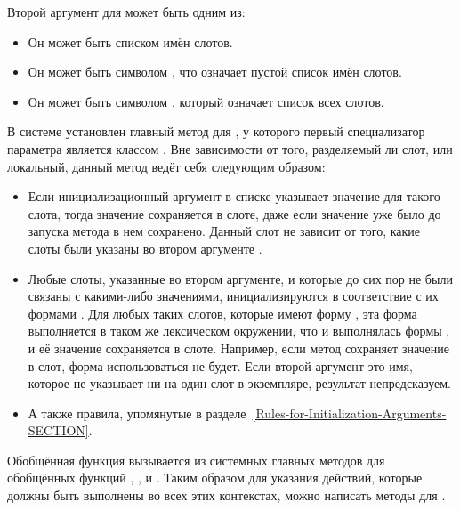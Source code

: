 Второй аргумент для  может быть одним из:

\begin{itemize}
\item Он может быть списком имён слотов.

\item Он может быть символом , что означает пустой список имён слотов.

\item Он может быть символом , который означает список всех слотов.
\end{itemize}

В системе установлен главный метод для , у которого
первый специализатор параметра является классом . Вне
зависимости от того, разделяемый ли слот, или локальный, данный
метод ведёт себя следующим образом:

\begin{itemize}
\item Если инициализационный аргумент в списке указывает значение для такого
  слота, тогда значение сохраняется в слоте, даже если значение уже было до
  запуска метода в нем сохранено. Данный слот не зависит от того, какие слоты
  были указаны во втором аргументе .

\item Любые слоты, указанные во втором аргументе, и которые до сих пор не были связаны
с какими-либо значениями, инициализируются в соответствие с их формами
. Для любых таких слотов, которые имеют форму ,
эта форма выполняется в таком же лексическом окружении, что и выполнялась формы
, и её значение сохраняется в слоте. Например, если 
метод сохраняет значение в слот, форма  использоваться не
будет. Если второй аргумент это имя, которое не указывает ни на один слот в
экземпляре, результат непредсказуем.

\item А также правила, упомянутые в разделе~\ref{Rules-for-Initialization-Arguments-SECTION}.
\end{itemize}

Обобщённая функция  вызывается из системных главных
методов для обобщённых функций 
,
, 
 и 
. 
Таким образом для указания действий, которые должны быть выполнены во всех этих
контекстах, можно написать методы для .

